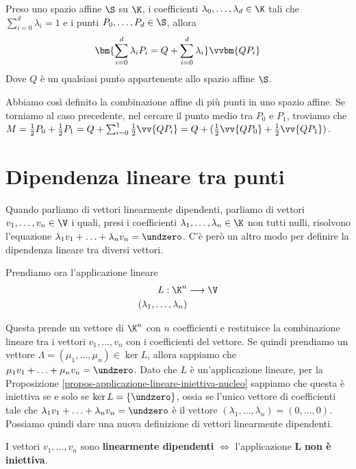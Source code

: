 \documentclass[11pt, a4paper, titlepage, oneside]{scrbook}
\begin{document}
\begin{Definizione}
\label{def-combinazione-affine-punti}
Preso uno spazio affine $\S$ su $\K$, i coefficienti $\lambda_0, \ldots, \lambda_d \in \K$ tali che $\sum_{i = 0}^d \lambda_i = 1$ e i punti $P_0, \ldots, P_d \in \S$, allora
\[
\bm{\sum_{i = 0}^d \lambda_i P_i = Q + \sum_{i = 0}^d \lambda_i} \vvbm{QP_i}
\]
Dove $Q$ è un qualsiasi punto appartenente allo spazio affine $\S$.
\end{Definizione}

Abbiamo così definito la combinazione affine di più punti in uno spazio affine. Se torniamo al caso precedente, nel cercare il punto medio tra $P_0$ e $P_1$, troviamo che $M = \frac{1}{2}P_0 + \frac{1}{2}P_1 = Q + \sum_{i = 0}^1 \frac{1}{2} \vv{QP_i} = Q + (\frac{1}{2} \vv{QP_0} + \frac{1}{2} \vv{QP_1})$.

\section{Dipendenza lineare tra punti}

Quando parliamo di vettori linearmente dipendenti, parliamo di vettori $v_1, \ldots, v_n \in \V$ i quali, presi i coefficienti $\lambda_1, \ldots, \lambda_n \in \K$ non tutti nulli, risolvono l'equazione $\lambda_1 v_1 + \ldots + \lambda_n v_n = \undzero$. C'è però un altro modo per definire la dipendenza lineare tra diversi vettori.

Prendiamo ora l'applicazione lineare 
\begin{align*}
L: \K^n &\longrightarrow \V \\
(\lambda_1, \ldots, \lambda_n)
\end{align*}

Questa prende un vettore di $\K^n$ con $n$ coefficienti e restituisce la combinazione lineare tra i vettori $v_1, \ldots, v_n$ con i coefficienti del vettore. Se quindi prendiamo un vettore $\Lambda = (\mu_1, \ldots, \mu_n) \in \ker L$, allora sappiamo che $\mu_1 v_1 + \ldots + \mu_n v_n = \undzero$. Dato che $L$ è un'applicazione lineare, per la Proposizione \ref{propos-applicazione-lineare-iniettiva-nucleo} sappiamo che questa è iniettiva se e solo se $\ker L = \{\undzero\}$, ossia se l'unico vettore di coefficienti tale che $\lambda_1 v_1 + \ldots + \lambda_n v_n = \undzero$ è il vettore $(\lambda_1, \ldots, \lambda_n) = (0,\ldots,0)$. Possiamo quindi dare una nuova definizione di vettori linearmente dipendenti.

\begin{Definizione}
\label{def-dipendenza-lineare-vettori}
I vettori $v_1, \ldots, v_n$ sono \textbf{linearmente dipendenti} $\iff$ l'applicazione $\bm{L}$ \textbf{non è iniettiva}.
\end{Definizione}
\end{document}
